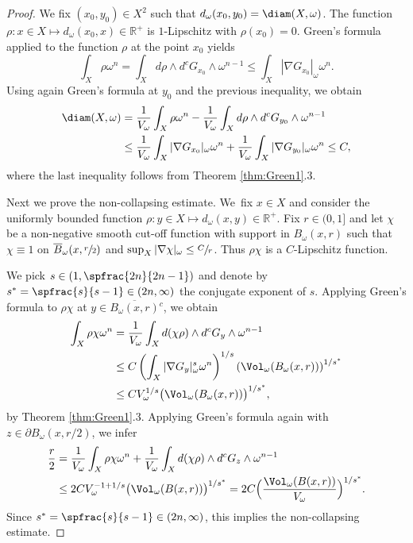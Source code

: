 \begin{proof}
We fix $(x_0,y_0)\in X^2$ such that $d_\omega(x_0,y_0)=\diam(X, \omega)$.
The function $\rho: x \in X \mapsto d_\omega(x_0, x) \in \mathbb{R}^+$ is $1$-Lipschitz
with $\rho(x_0)=0$. Green's formula applied to the function $\rho$ at the point $x_0$ yields
\[
\int_X \rho \omega^n =\int_X d \rho \wedge d^c G_{x_0} \wedge\omega^{n-1} \leq \int_X |\nabla G_{x_0}|_{\omega}\omega^n .
\]
Using again Green's formula at $y_0$ and the previous inequality, we obtain
\begin{align*}
\diam(X, \omega)
&= \frac{1}{V_\omega} \int_X \rho\omega^n - \frac{1}{V_\omega} \int_X d \rho \wedge d^c G_{y_0} \wedge\omega^{n-1}\\
&\leq  \frac{1}{V_\omega}\int_X |\nabla G_{x_0}|_{\omega}\omega^n
+\frac{1}{V_\omega}\int_X |\nabla G_{y_0}|_{\omega}\omega^n \leq C,
\end{align*}
where the last inequality follows from Theorem \ref{thm:Green1}.3.

Next we prove the non-collapsing estimate. We~fix $x \in X$ and consider the uniformly bounded function $\rho: y \in X \mapsto d_\omega(x, y) \in \mathbb{R}^+$.
Fix $r\in (0,1]$ and let $\chi$ be a non-negative smooth cut-off function with support in $B_\omega(x, r)$ such that
$\chi\equiv 1$ on $\overline{B}_\omega(x, \sfrac{r}{2}) $ and $\sup_X |\nabla \chi|_\omega \leq \sfrac{C}{r}$.
Thus $\rho \chi$ is a $C$-Lipschitz function.

We pick $s\in (1, \spfrac{2n}{2n-1})$ and denote by $s^*=\spfrac{s}{s-1} \in (2n, \infty)$ the conjugate exponent of $s$.
Applying Green's formula to $\rho \chi$ at $y\in \overline{B_{\omega}(x,r )}{}^c $, we obtain
\begin{align*}
\int_X \rho\chi \omega^n &= \frac{1}{V_\omega} \int_X d(\chi \rho) \wedge d^c G_y \wedge \omega^{n-1} \\
&\leq C
\left(\int_X |\nabla G_y|^s_\omega \omega^n\right)^{1/s} \left(\Vol_\omega(B_{\omega}(x,r)) \right)^{1/s^*}\\
&\leq CV_\omega^{1/s} \bigl(\Vol_\omega(B_{\omega}(x,r)) \bigr)^{1/s^*},
\end{align*}
by Theorem \ref{thm:Green1}.3.
Applying Green's formula again with $z\in \partial B_\omega(x, r/2)$, we infer
\begin{align*}
\frac{r}{2} &=\frac{1}{V_\omega} \int_X \rho\chi \omega^n
+ \frac{1}{V_\omega} \int_X d(\chi \rho) \wedge d^c G_z \wedge \omega^{n-1} \\
&\leq 2CV_\omega^{-1+1/s} \bigl(\Vol_\omega(B(x,r)) \bigr)^{1/s^*}= 2C\Bigl( \frac{\Vol_\omega(B(x,r)) }{V_\omega} \Bigr)^{1/s^*}.
\end{align*}
Since $s^*=\spfrac{s}{s-1}\in (2n, \infty)$, this implies the non-collapsing estimate.


\end{proof}
